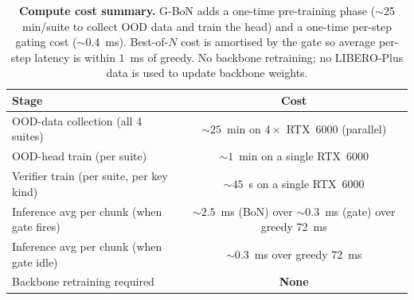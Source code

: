 \begin{table}[h]
\centering
\caption{\textbf{Compute cost summary.} G-BoN adds a one-time pre-training
phase ($\sim$25 min/suite to collect OOD data and train the head) and a
one-time per-step gating cost ($\sim 0.4$~ms). Best-of-$N$ cost is
amortised by the gate so average per-step latency is within $1$~ms of
greedy. No backbone retraining; no LIBERO-Plus data is used to update
backbone weights.}
\label{tab:compute}
\begin{tabular}{lc}
\toprule
Stage                                         & Cost \\
\midrule
OOD-data collection (all 4 suites)            & $\sim 25$~min on $4\times$ RTX~6000 (parallel) \\
OOD-head train (per suite)                    & $\sim 1$~min on a single RTX~6000 \\
Verifier train (per suite, per key kind)      & $\sim 45$~s on a single RTX~6000 \\
Inference avg per chunk (when gate fires)     & $\sim 2.5$~ms (BoN) over $\sim 0.3$~ms (gate) over greedy 72~ms \\
Inference avg per chunk (when gate idle)      & $\sim 0.3$~ms over greedy 72~ms \\
Backbone retraining required                  & \textbf{None} \\
\bottomrule
\end{tabular}
\end{table}
